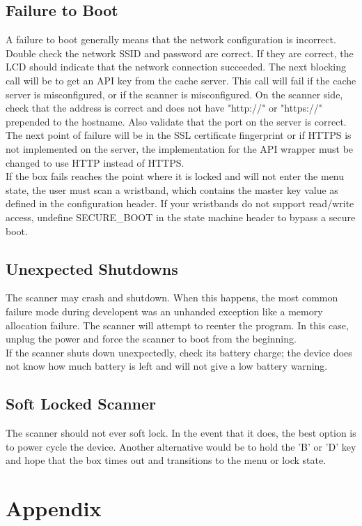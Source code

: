 \documentclass{article}
\begin{document}
\subsection{Failure to Boot}
A failure to boot generally means that the network configuration is incorrect.  Double check the network SSID and password are correct.  If they are correct, the LCD should indicate that the network connection succeeded.  The next blocking call will be to get an API key from the cache server.  This call will fail if the cache server is misconfigured, or if the scanner is misconfigured.  On the scanner side, check that the address is correct and does not have "http://" or "https://" prepended to the hostname.  Also validate that the port on the server is correct.  The next point of failure will be in the SSL certificate fingerprint or if HTTPS is not implemented on the server, the implementation for the API wrapper must be changed to use HTTP instead of HTTPS.  \\
If the box fails reaches the point where it is locked and will not enter the menu state, the user must scan a wristband, which contains the master key value as defined in the configuration header.  If your wristbands do not support read/write access, undefine SECURE\_BOOT in the state machine header to bypass a secure boot.  

\subsection{Unexpected Shutdowns}
The scanner may crash and shutdown.  When this happens, the most common failure mode during developent was an unhanded exception like a memory allocation failure.  The scanner will attempt to reenter the program.  In this case, unplug the power and force the scanner to boot from the beginning.  \\
If the scanner shuts down unexpectedly, check its battery charge; the device does not know how much battery is left and will not give a low battery warning.  

\subsection{Soft Locked Scanner}
The scanner should not ever soft lock.  In the event that it does, the best option is to power cycle the device.  Another alternative would be to hold the 'B' or 'D' key and hope that the box times out and transitions to the menu or lock state.

\section{Appendix}
\end{document}
